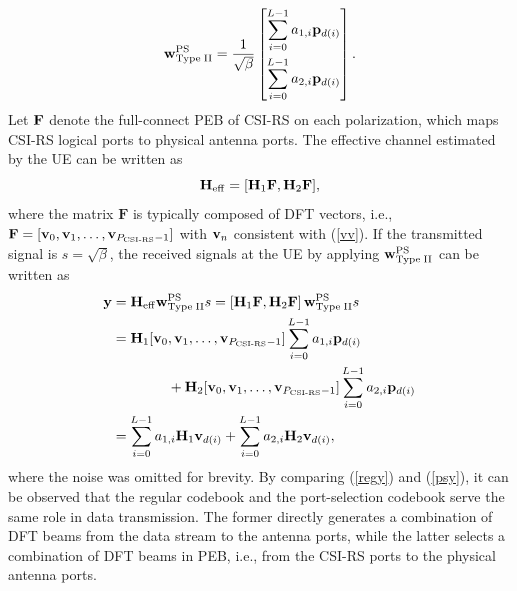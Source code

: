 \documentclass[lettersize,journal]{IEEEtran}
\begin{document}
\begin{equation}
{\bf{w}}_{{\rm{Type \;II}}}^{{\rm{PS}}} = \frac{1}{{\sqrt \beta  }}\left[ {\begin{aligned}
{\sum\limits_{i = 0}^{L - 1} {{a_{1,i}}{{\bf{p}}_{d(i)}}} }\\
{\sum\limits_{i = 0}^{L - 1} {{a_{2,i}}{{\bf{p}}_{d(i)}}}}
\end{aligned}} \right].
\end{equation}
Let $\bf{F}$ denote the full-connect PEB of CSI-RS on each polarization, which maps CSI-RS logical ports to physical antenna ports. The effective channel estimated by the UE can be written as 
\begin{equation}
{{\bf{H}}_{{\rm{eff}}}} = [{{\bf{H}}_1}{\bf{F}},{{\bf{H}}_2}{\bf{F}}],
\end{equation}
where the matrix $\mathbf{F}$ is typically composed of DFT vectors, i.e., ${\bf{F}} = [{{\bf{v}}_0},{{\bf{v}}_1},\ldots,{{\bf{v}}_{{P_{\rm{CSI\text{-}RS}}}-1}}]$ with ${{\bf{v}}_n}$ consistent with (\ref{vv}). If the transmitted signal is $s={\sqrt{\beta}}$, the received signals at the UE by applying ${\bf{w}}_{{\rm{Type \;II}}}^{{\rm{PS}}}$ can be written as
\begin{equation}\label{psy}
\begin{aligned}
{\bf{y}} &= {{\bf{H}}_{{\rm{eff}}}}{\bf{w}}_{{\rm{Type\; II}}}^{{\rm{PS}}}s = \left[ {{{\bf{H}}_1}{\bf{F}},{{\bf{H}}_2}{\bf{F}}} \right]{\bf{w}}_{{\rm{Type\; II}}}^{{\rm{PS}}}s\\
 &= {{\bf{H}}_1}[{{\bf{v}}_0},{{\bf{v}}_1},\ldots,{{\bf{v}}_{{P_{\rm{CSI\text{-}RS}}} - 1}}]\sum\limits_{i = 0}^{L - 1} {{a_{1,i}}{{\bf{p}}_{d(i)}}} \\
 & \qquad \qquad + {{\bf{H}}_2}[{{\bf{v}}_0},{{\bf{v}}_1},\ldots,{{\bf{v}}_{{P_{\rm{CSI\text{-}RS}}} - 1}}]\sum\limits_{i = 0}^{L - 1} {{a_{2,i}}{{\bf{p}}_{d(i)}}} \\
 &= \sum\limits_{i = 0}^{L - 1} {{a_{1,i}}{{\bf{H}}_1}{{\bf{v}}_{d(i)}}}  + \sum\limits_{i = 0}^{L - 1} {{a_{2,i}}{{\bf{H}}_2}{{\bf{v}}_{d(i)}}},
\end{aligned}
\end{equation}
where the noise was omitted for brevity.
By comparing (\ref{regy}) and (\ref{psy}), it can be observed that the regular codebook and the port-selection codebook serve the same role in data transmission. The former directly generates a combination of DFT beams from the data stream to the antenna ports, while the latter selects a combination of DFT beams in PEB, i.e., from the CSI-RS ports to the physical antenna ports.
\end{document}
